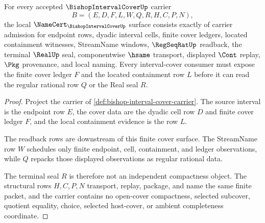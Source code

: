 \begin{theorem}
\label{thm:bishop-interval-cover-namecert-obligations}
For every accepted $\BishopIntervalCoverUp$ carrier
$$
B=(E,D,F,L,W,Q,R,H,C,P,N),
$$
the local $\NameCert_{\BishopIntervalCoverUp}$ surface consists exactly of carrier admission for endpoint rows, dyadic interval cells, finite cover ledgers, located containment witnesses, StreamName windows, $\RegSeqRatUp$ readback, the terminal $\RealUp$ seal, componentwise $\hsame$ transport, displayed $\Cont$ replay, $\Pkg$ provenance, and local naming. Every interval-cover consumer must expose the finite cover ledger $F$ and the located containment row $L$ before it can read the regular rational row $Q$ or the Real seal $R$.
\end{theorem}
\begin{proof}
Project the carrier of \autoref{def:bishop-interval-cover-carrier}. The source interval is the endpoint row $E$, the cover data are the dyadic cell row $D$ and finite cover ledger $F$, and the local containment evidence is the row $L$.

The readback rows are downstream of this finite cover surface. The StreamName row $W$ schedules only finite endpoint, cell, containment, and ledger observations, while $Q$ repacks those displayed observations as regular rational data.

The terminal seal $R$ is therefore not an independent compactness object. The structural rows $H,C,P,N$ transport, replay, package, and name the same finite packet, and the carrier contains no open-cover compactness, selected subcover, quotient equality, choice, selected host-cover, or ambient completeness coordinate.
\end{proof}

